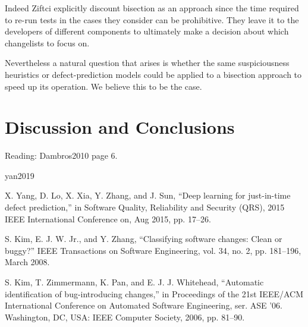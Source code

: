 \documentclass[10pt,journal,compsoc]{IEEEtran}
\begin{document}
Indeed Ziftci \etal explicitly discount bisection as an approach since the time required to re-run tests in the cases they consider can be prohibitive. They leave it to the developers of different components to ultimately make a decision about which changelists to focus on.

Nevertheless a natural question that arises is whether the same suspiciousness heuristics or defect-prediction models could be applied to a bisection approach to speed up its operation. We believe this to be the case. 

\section{Discussion and Conclusions}

Reading: Dambros2010 page 6.


yan2019

X. Yang, D. Lo, X. Xia, Y. Zhang, and J. Sun, “Deep learning for just-in-time defect prediction,” in Software Quality, Reliability and Security (QRS), 2015 IEEE International Conference on, Aug 2015, pp. 17–26.

S. Kim, E. J. W. Jr., and Y. Zhang, “Classifying software changes: Clean or buggy?” IEEE Transactions on Software Engineering, vol. 34, no. 2, pp. 181–196, March 2008.

S. Kim, T. Zimmermann, K. Pan, and E. J. J. Whitehead, “Automatic identification of bug-introducing changes,” in Proceedings of the 21st IEEE/ACM International Conference on Automated Software Engineering, ser. ASE ’06. Washington, DC, USA: IEEE Computer Society, 2006, pp. 81–90.


 

%
%
\end{document}
